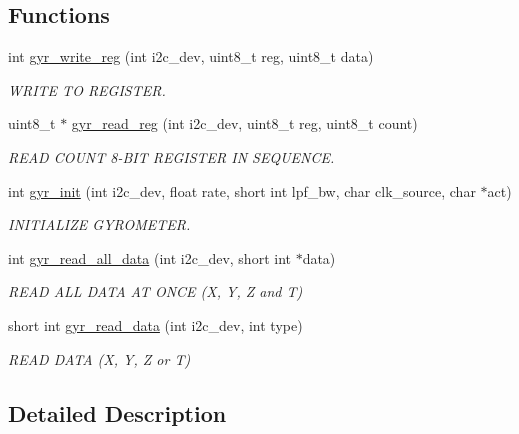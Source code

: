 \subsection*{Functions}
\begin{DoxyCompactItemize}
\item 
int \hyperlink{group__gyr_ga3eba167b8ab0614bfe7bafeae8b5570d}{gyr\-\_\-write\-\_\-reg} (int i2c\-\_\-dev, uint8\-\_\-t reg, uint8\-\_\-t data)
\begin{DoxyCompactList}\small\item\em W\-R\-I\-T\-E T\-O R\-E\-G\-I\-S\-T\-E\-R. \end{DoxyCompactList}\item 
uint8\-\_\-t $\ast$ \hyperlink{group__gyr_gad817a3b69d4c3026b7a9b6de32753e7b}{gyr\-\_\-read\-\_\-reg} (int i2c\-\_\-dev, uint8\-\_\-t reg, uint8\-\_\-t count)
\begin{DoxyCompactList}\small\item\em R\-E\-A\-D C\-O\-U\-N\-T 8-\/\-B\-I\-T R\-E\-G\-I\-S\-T\-E\-R I\-N S\-E\-Q\-U\-E\-N\-C\-E. \end{DoxyCompactList}\item 
int \hyperlink{group__gyr_ga6d02be352b4491a236c9695a6a24d174}{gyr\-\_\-init} (int i2c\-\_\-dev, float rate, short int lpf\-\_\-bw, char clk\-\_\-source, char $\ast$act)
\begin{DoxyCompactList}\small\item\em I\-N\-I\-T\-I\-A\-L\-I\-Z\-E G\-Y\-R\-O\-M\-E\-T\-E\-R. \end{DoxyCompactList}\item 
int \hyperlink{group__gyr_ga79875465c3a29fd9ec77308c80a8bc37}{gyr\-\_\-read\-\_\-all\-\_\-data} (int i2c\-\_\-dev, short int $\ast$data)
\begin{DoxyCompactList}\small\item\em R\-E\-A\-D A\-L\-L D\-A\-T\-A A\-T O\-N\-C\-E (X, Y, Z and T) \end{DoxyCompactList}\item 
short int \hyperlink{group__gyr_ga271b37e9ace81b18bb2f83787247d262}{gyr\-\_\-read\-\_\-data} (int i2c\-\_\-dev, int type)
\begin{DoxyCompactList}\small\item\em R\-E\-A\-D D\-A\-T\-A (X, Y, Z or T) \end{DoxyCompactList}\end{DoxyCompactItemize}


\subsection{Detailed Description}


